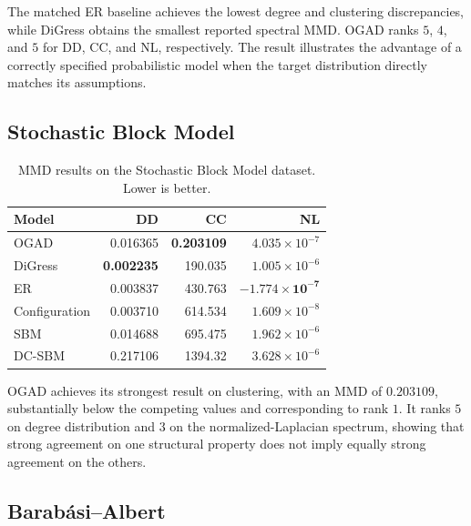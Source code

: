 The matched ER baseline achieves the lowest degree and clustering discrepancies, while DiGress obtains the smallest reported spectral MMD. OGAD ranks \(5\), \(4\), and \(5\) for DD, CC, and NL, respectively. The result illustrates the advantage of a correctly specified probabilistic model when the target distribution directly matches its assumptions.


\subsection{Stochastic Block Model}
\label{subsec:exp_sbm}

\begin{table}[htbp]
    \centering
    \caption{MMD results on the Stochastic Block Model dataset. Lower is better.}
    \label{tab:exp_sbm}
    \begin{tabular}{lrrr}
        \hline
        Model & DD & CC & NL \\
        \hline
        OGAD          & 0.016365 & \textbf{0.203109} & \(4.035\times10^{-7}\) \\
        DiGress       & \textbf{0.002235} & 190.035 & \(1.005\times10^{-6}\) \\
        ER            & 0.003837 & 430.763 & \(\mathbf{-1.774\times10^{-7}}\) \\
        Configuration & 0.003710 & 614.534 & \(1.609\times10^{-8}\) \\
        SBM           & 0.014688 & 695.475 & \(1.962\times10^{-6}\) \\
        DC-SBM  & 0.217106 & 1394.32 & \(3.628\times10^{-6}\) \\
        \hline
    \end{tabular}
\end{table}

OGAD achieves its strongest result on clustering, with an MMD of \(0.203109\), substantially below the competing values and corresponding to rank \(1\). It ranks \(5\) on degree distribution and \(3\) on the normalized-Laplacian spectrum, showing that strong agreement on one structural property does not imply equally strong agreement on the others.


\subsection{Barab\'asi--Albert}
\label{subsec:exp_ba}

